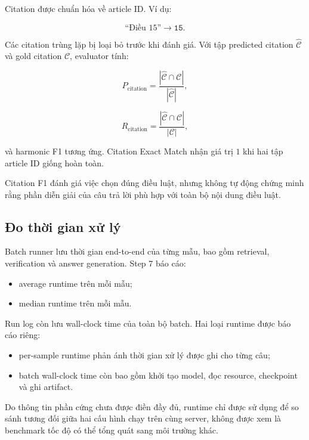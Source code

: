 Citation được chuẩn hóa về article ID. Ví dụ:

\[
\text{``Điều 15''}
\longrightarrow
\texttt{15}.
\]

Các citation trùng lặp bị loại bỏ trước khi đánh giá. Với tập predicted
citation \(\widehat{\mathcal{C}}\) và gold citation \(\mathcal{C}\), evaluator
tính:

\begin{equation}
P_{\mathrm{citation}}
=
\frac{
    |
    \widehat{\mathcal{C}}
    \cap
    \mathcal{C}
    |
}{
    |
    \widehat{\mathcal{C}}
    |
},
\end{equation}

\begin{equation}
R_{\mathrm{citation}}
=
\frac{
    |
    \widehat{\mathcal{C}}
    \cap
    \mathcal{C}
    |
}{
    |
    \mathcal{C}
    |
},
\end{equation}

và harmonic F1 tương ứng. Citation Exact Match nhận giá trị \(1\) khi hai
tập article ID giống hoàn toàn.

Citation F1 đánh giá việc chọn đúng điều luật, nhưng không tự động chứng minh
rằng phần diễn giải của câu trả lời phù hợp với toàn bộ nội dung điều luật.

\subsection{Đo thời gian xử lý}

Batch runner lưu thời gian end-to-end của từng mẫu, bao gồm retrieval,
verification và answer generation. Step 7 báo cáo:

\begin{itemize}
    \item average runtime trên mỗi mẫu;
    \item median runtime trên mỗi mẫu.
\end{itemize}

Run log còn lưu wall-clock time của toàn bộ batch. Hai loại runtime được báo
cáo riêng:

\begin{itemize}
    \item per-sample runtime phản ánh thời gian xử lý được ghi cho từng câu;
    \item batch wall-clock time còn bao gồm khởi tạo model, đọc resource,
    checkpoint và ghi artifact.
\end{itemize}

Do thông tin phần cứng chưa được điền đầy đủ, runtime chỉ được sử dụng để so
sánh tương đối giữa hai cấu hình chạy trên cùng server, không được xem là
benchmark tốc độ có thể tổng quát sang môi trường khác.

